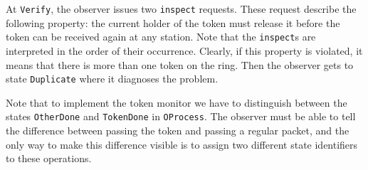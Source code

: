 At {\tt Verify}, the observer issues two {\tt inspect} requests.
These request describe the following property:
the current holder of the token must release it before the token can be
received again at any station.
Note that the {\tt inspect}s are interpreted in the order of their
occurrence.
Clearly, if this property is violated, it means that there is more than one
token on the ring.
Then the observer gets to state {\tt Duplicate} where it diagnoses the problem.

Note that to implement the token monitor we have to distinguish between the
states {\tt OtherDone} and {\tt TokenDone} in {\tt OProcess}.
The observer must be able to tell the difference between passing the token
and passing a regular packet, and the only way to make this difference
visible is to assign two different state identifiers to these
operations.



